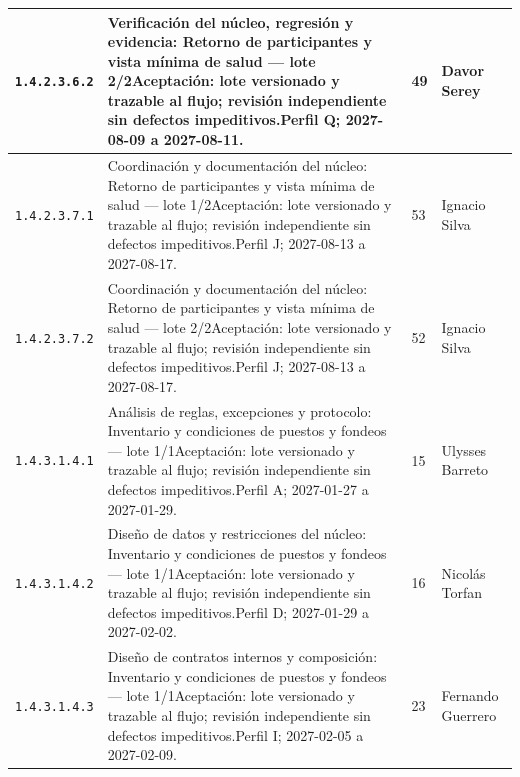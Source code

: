\begin{longtable}{L{29mm}L{80mm}R{12mm}L{28mm}}
\texttt{1.\allowbreak{}4.\allowbreak{}2.\allowbreak{}3.\allowbreak{}6.\allowbreak{}2} & Verificación del núcleo, regresión y evidencia: Retorno de participantes y vista mínima de salud — lote 2/2\newline Aceptación: lote versionado y trazable al flujo; revisión independiente sin defectos impeditivos.\newline Perfil Q; 2027-08-09 a 2027-08-11. & 49 & Davor Serey\\\hline
\texttt{1.\allowbreak{}4.\allowbreak{}2.\allowbreak{}3.\allowbreak{}7.\allowbreak{}1} & Coordinación y documentación del núcleo: Retorno de participantes y vista mínima de salud — lote 1/2\newline Aceptación: lote versionado y trazable al flujo; revisión independiente sin defectos impeditivos.\newline Perfil J; 2027-08-13 a 2027-08-17. & 53 & Ignacio Silva\\\hline
\texttt{1.\allowbreak{}4.\allowbreak{}2.\allowbreak{}3.\allowbreak{}7.\allowbreak{}2} & Coordinación y documentación del núcleo: Retorno de participantes y vista mínima de salud — lote 2/2\newline Aceptación: lote versionado y trazable al flujo; revisión independiente sin defectos impeditivos.\newline Perfil J; 2027-08-13 a 2027-08-17. & 52 & Ignacio Silva\\\hline
\texttt{1.\allowbreak{}4.\allowbreak{}3.\allowbreak{}1.\allowbreak{}4.\allowbreak{}1} & Análisis de reglas, excepciones y protocolo: Inventario y condiciones de puestos y fondeos — lote 1/1\newline Aceptación: lote versionado y trazable al flujo; revisión independiente sin defectos impeditivos.\newline Perfil A; 2027-01-27 a 2027-01-29. & 15 & Ulysses Barreto\\\hline
\texttt{1.\allowbreak{}4.\allowbreak{}3.\allowbreak{}1.\allowbreak{}4.\allowbreak{}2} & Diseño de datos y restricciones del núcleo: Inventario y condiciones de puestos y fondeos — lote 1/1\newline Aceptación: lote versionado y trazable al flujo; revisión independiente sin defectos impeditivos.\newline Perfil D; 2027-01-29 a 2027-02-02. & 16 & Nicolás Torfan\\\hline
\texttt{1.\allowbreak{}4.\allowbreak{}3.\allowbreak{}1.\allowbreak{}4.\allowbreak{}3} & Diseño de contratos internos y composición: Inventario y condiciones de puestos y fondeos — lote 1/1\newline Aceptación: lote versionado y trazable al flujo; revisión independiente sin defectos impeditivos.\newline Perfil I; 2027-02-05 a 2027-02-09. & 23 & Fernando Guerrero\\\hline

\end{longtable}
